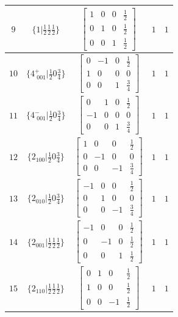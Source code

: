 \documentclass[fleqn,8pt]{jsarticle}
\begin{document}
\begin{longtable}{ccccc}
$ 9 $ & $ \{1|\frac{1}{2} \frac{1}{2} \frac{1}{2}\} $ & $ \begin{bmatrix} 1 & 0 & 0 & \frac{1}{2} \\ 0 & 1 & 0 & \frac{1}{2} \\ 0 & 0 & 1 & \frac{1}{2} \end{bmatrix} $ & $ 1 $ & $ 1 $ \\ \hline
$ 10 $ & $ \{4^{+}_{\,\,001}|\frac{1}{2} 0 \frac{3}{4}\} $ & $ \begin{bmatrix} 0 & -1 & 0 & \frac{1}{2} \\ 1 & 0 & 0 & 0 \\ 0 & 0 & 1 & \frac{3}{4} \end{bmatrix} $ & $ 1 $ & $ 1 $ \\ \hline
$ 11 $ & $ \{4^{-}_{\,\,001}|\frac{1}{2} 0 \frac{3}{4}\} $ & $ \begin{bmatrix} 0 & 1 & 0 & \frac{1}{2} \\ -1 & 0 & 0 & 0 \\ 0 & 0 & 1 & \frac{3}{4} \end{bmatrix} $ & $ 1 $ & $ 1 $ \\ \hline
$ 12 $ & $ \{2{}_{100}|\frac{1}{2} 0 \frac{3}{4}\} $ & $ \begin{bmatrix} 1 & 0 & 0 & \frac{1}{2} \\ 0 & -1 & 0 & 0 \\ 0 & 0 & -1 & \frac{3}{4} \end{bmatrix} $ & $ 1 $ & $ 1 $ \\ \hline
$ 13 $ & $ \{2{}_{010}|\frac{1}{2} 0 \frac{3}{4}\} $ & $ \begin{bmatrix} -1 & 0 & 0 & \frac{1}{2} \\ 0 & 1 & 0 & 0 \\ 0 & 0 & -1 & \frac{3}{4} \end{bmatrix} $ & $ 1 $ & $ 1 $ \\ \hline
$ 14 $ & $ \{2{}_{001}|\frac{1}{2} \frac{1}{2} \frac{1}{2}\} $ & $ \begin{bmatrix} -1 & 0 & 0 & \frac{1}{2} \\ 0 & -1 & 0 & \frac{1}{2} \\ 0 & 0 & 1 & \frac{1}{2} \end{bmatrix} $ & $ 1 $ & $ 1 $ \\ \hline
$ 15 $ & $ \{2{}_{110}|\frac{1}{2} \frac{1}{2} \frac{1}{2}\} $ & $ \begin{bmatrix} 0 & 1 & 0 & \frac{1}{2} \\ 1 & 0 & 0 & \frac{1}{2} \\ 0 & 0 & -1 & \frac{1}{2} \end{bmatrix} $ & $ 1 $ & $ 1 $ \\ \hline

\end{longtable}
\end{document}
